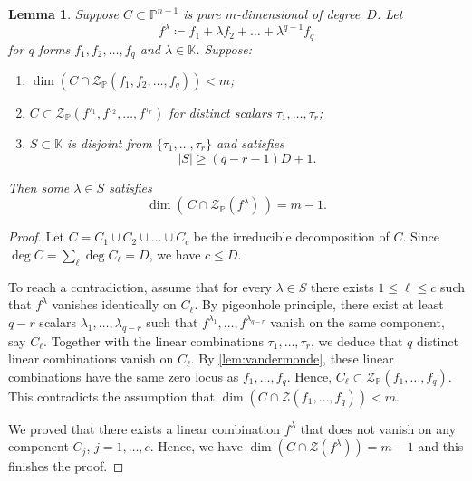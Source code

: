 \documentclass[11pt,a4paper]{article}
\newtheorem{lemma}[theorem]{Lemma}\AddToHook{env/lemma/begin}{\crefalias{theorem}{lemma}}
\numberwithin{equation}{section}
\newcommand{\PP}{\mathbb{P}}
\newcommand{\KK}{\mathbb{K}}
\newcommand{\cZ}{\mathcal{Z}}
\begin{document}
\begin{lemma}
\label{prop:dimension-drop}
    Suppose $C\subset\PP^{n-1}$ is pure $m$-dimensional of degree~$D$.
    Let \[
    f^\lambda \coloneqq f_1 + \lambda f_2 + \dots + \lambda^{q-1} f_q
    \] for $q$ forms $f_1,f_2,\dots,f_q$ and $\lambda\in\KK$.
    Suppose:
    \begin{enumerate}
        \item $\dim\left(C\cap\cZ_{\PP}(f_1,f_2,\dots,f_q)\right)<m$;
        \item $C\subset\cZ_{\PP}(f^{\tau_1},f^{\tau_2},\dots,f^{\tau_r})$ for distinct scalars $\tau_1,\dots,\tau_r$;
        \item $S\subset\KK$ is disjoint from $\{\tau_1,\dots,\tau_r\}$ and satisfies \[
        |S|\geq (q-r-1)D+1.
        \]
    \end{enumerate}
    Then some $\lambda\in S$ satisfies \[
    \dim\left(\, C\cap\cZ_{\PP}(f^\lambda) \,\right) = m-1.
    \]
\end{lemma}
\begin{proof}
    Let $C=C_1 \cup C_2 \cup\dots \cup C_c$ be the irreducible decomposition of $C$. 
    Since $\deg C = \sum_\ell \deg C_\ell = D$, we have $c\leq D$.

    To reach a contradiction, assume that for every $\lambda\in S$ there exists $1\leq \ell\leq c$ such that $f^\lambda$ vanishes identically on $C_\ell$.
    By pigeonhole principle, there exist at least $q-r$ scalars $\lambda_1,\dots,\lambda_{q-r}$ such that $f^{\lambda_1},\dots,f^{\lambda_{q-r}}$ vanish on the same component, say $C_\ell$.
    Together with the linear combinations $\tau_1,\dots,\tau_{r}$, we deduce that $q$ distinct linear combinations vanish on $C_\ell$.
    By \cref{lem:vandermonde}, these linear combinations have the same zero locus as $f_1,\dots,f_q$.
    Hence, $C_\ell\subset\cZ_{\PP}(f_1,\dots,f_q)$.
    This contradicts the assumption that $\dim\left(C\cap \cZ(f_1,\dots,f_q)\right)<m$.

    We proved that there exists a linear combination $f^{\lambda}$ that does not vanish on any component $C_j$, $j=1,\dots,c$.
    Hence, we have $\dim(C\cap \cZ(f^{\lambda}))=m-1$ and this finishes the proof.
\end{proof}
\end{document}

